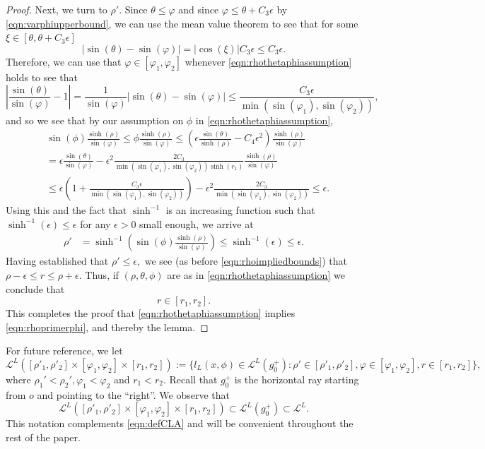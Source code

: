\documentclass[a4paper,12pt]{article}
\newcommand{\CL}{{\mathcal{L}}}
\begin{document}
\begin{proof}
Next, we turn to $\rho'$. 
Since $\theta \leq \varphi$ and since $\varphi \leq \theta+C_3\epsilon$ by
\eqref{eqn:varphiupperbound}, we can use the mean value theorem
to see that for some $\xi\in[\theta,\theta+C_3\epsilon]$
\[
|\sin(\theta)-\sin(\varphi)|=|\cos(\xi)| C_3 \epsilon \leq C_3 \epsilon.
\]
Therefore, we can use that $\varphi\in[\varphi_1,\varphi_2]$ whenever 
\eqref{eqn:rhothetaphiassumption} holds to see that
\[
\left|\frac{\sin(\theta)}{\sin(\varphi)}-1\right|
=\frac{1}{\sin(\varphi)}\left|\sin(\theta)-\sin(\varphi)\right|
\leq \frac{C_3 \epsilon}{\min(\sin(\varphi_1),\sin(\varphi_2))},
\]
and so we see that by our assumption on $\phi$ in \eqref{eqn:rhothetaphiassumption},
\begin{align}
& \sin(\phi) \frac{\sinh(\rho)}{\sin(\varphi)}
\leq \phi \frac{\sinh(\rho)}{\sin(\varphi)}
\leq \left(\epsilon\frac{\sin(\theta)}{\sinh(\rho)}-C_4\epsilon^2 \right)
\frac{\sinh(\rho)}{\sin(\varphi)} \\
& =\epsilon\frac{\sin(\theta)}{\sin(\varphi)}
-\epsilon^2 \frac{2C_3}{\min(\sin(\varphi_1),\sin(\varphi_2))\sinh(r_1)}
\frac{\sinh(\rho)}{\sin(\varphi)} \nonumber\\
& \leq \epsilon\left(1+\frac{C_3 \epsilon}{\min(\sin(\varphi_1),\sin(\varphi_2))}\right)
-\epsilon^2 \frac{2C_3}{\min(\sin(\varphi_1),\sin(\varphi_2))}
\leq \epsilon.
\nonumber
\end{align}
Using this and the fact that $\sinh^{-1}$ is an increasing function 
such that $\sinh^{-1}(\epsilon)\leq \epsilon$
for any $\epsilon>0$ small enough, we arrive at 
\begin{align*}
\rho'& =\sinh^{-1}\left(\sin(\phi) \frac{\sinh(\rho)}{\sin(\varphi)}\right)    
\leq \sinh^{-1}\left(\epsilon\right)  \leq  \epsilon.
\end{align*}
Having established that $\rho'\leq \epsilon,$ we see (as before \eqref{eqn:rhoimpliedbounds})
that $\rho-\epsilon \leq r \leq \rho+\epsilon.$ Thus, if $(\rho,\theta,\phi)$ are as in 
\eqref{eqn:rhothetaphiassumption} we conclude that 
\[
r\in[r_1,r_2].
\]
This completes the proof that \eqref{eqn:rhothetaphiassumption} implies 
\eqref{eqn:rhoprimerphi}, and thereby the lemma.
\end{proof}

For future reference, we let
\begin{equation} \label{eqn:defCL_alt}
\CL^L([\rho'_1,\rho'_2]\times[\varphi_1,\varphi_2]\times[r_1,r_2]) 
:=\{l_L(x,\phi)\in \CL^L(g_0^+): 
\rho'\in [\rho'_1,\rho'_2], \varphi \in [\varphi_1,\varphi_2], r\in[r_1,r_2]\},   
\end{equation}
where $\rho_1'<\rho_2', \varphi_1<\varphi_2$ and $r_1<r_2.$ 
Recall that $g_0^+$ is the horizontal ray starting from $o$ and
pointing to the ``right''. We observe that
\[
\CL^L([\rho'_1,\rho'_2]\times[\varphi_1,\varphi_2]\times[r_1,r_2])
\subset \CL^L(g_0^+) \subset \CL^L.
\]
This notation complements \eqref{eqn:defCLA} and will be convenient throughout the 
rest of the paper.
\end{document}

